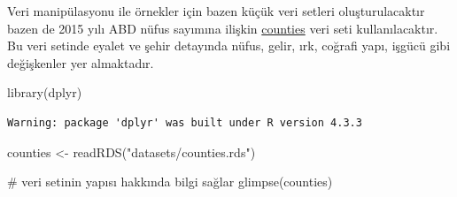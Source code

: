 \documentclass[
  letterpaper,
  DIV=11,
  numbers=noendperiod]{scrreprt}
\newenvironment{Shaded}{\begin{snugshade}}{\end{snugshade}}
\newcommand{\CommentTok}[1]{\textcolor[rgb]{0.37,0.37,0.37}{#1}}
\newcommand{\FunctionTok}[1]{\textcolor[rgb]{0.28,0.35,0.67}{#1}}
\newcommand{\NormalTok}[1]{\textcolor[rgb]{0.00,0.23,0.31}{#1}}
\newcommand{\OtherTok}[1]{\textcolor[rgb]{0.00,0.23,0.31}{#1}}
\newcommand{\StringTok}[1]{\textcolor[rgb]{0.13,0.47,0.30}{#1}}
\begin{document}
Veri manipülasyonu ile örnekler için bazen küçük veri setleri
oluşturulacaktır bazen de 2015 yılı ABD nüfus sayımına ilişkin
\href{https://github.com/MFatihTuzen/r-book-tr/blob/main/datasets/counties.rds}{counties}
veri seti kullanılacaktır. Bu veri setinde eyalet ve şehir detayında
nüfus, gelir, ırk, coğrafi yapı, işgücü gibi değişkenler yer almaktadır.

\begin{Shaded}
\begin{Highlighting}[]
\FunctionTok{library}\NormalTok{(dplyr)}
\end{Highlighting}
\end{Shaded}

\begin{verbatim}
Warning: package 'dplyr' was built under R version 4.3.3
\end{verbatim}

\begin{Shaded}
\begin{Highlighting}[]
\NormalTok{counties }\OtherTok{\textless{}{-}} \FunctionTok{readRDS}\NormalTok{(}\StringTok{"datasets/counties.rds"}\NormalTok{)}

\CommentTok{\# veri setinin yapısı hakkında bilgi sağlar}
\FunctionTok{glimpse}\NormalTok{(counties)}
\end{Highlighting}
\end{Shaded}
\end{document}
